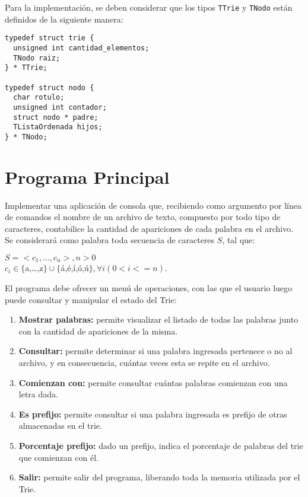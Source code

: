 \documentclass[12pt,a4paper]{article}
\begin{document}
\pagebreak

Para la implementación, se deben considerar que los tipos \texttt{TTrie} y \texttt{TNodo} están definidos de la siguiente manera:

\begin{verbatim}
typedef struct trie {
  unsigned int cantidad_elementos;
  TNodo raiz;
} * TTrie;

typedef struct nodo {
  char rotulo;
  unsigned int contador;
  struct nodo * padre;
  TListaOrdenada hijos;
} * TNodo;

\end{verbatim}

\section{Programa Principal}
Implementar una aplicación de consola que, recibiendo como argumento por línea de comandos el nombre de un archivo de texto, compuesto por todo tipo de caracteres, contabilice la cantidad de apariciones de cada palabra en el archivo. Se considerará como palabra toda secuencia de caracteres $S$, tal que:
\begin{center}
$S=<c_1,\dots,c_n>, n>0$\\
$c_i \in \{$a,\dots,z$\} \cup \{$á,é,í,ó,ú$\}, \forall{i} (0<i<=n)$.
\end{center}

El programa debe ofrecer un menú de operaciones, con las que el usuario luego puede consultar y manipular el estado del Trie:
\begin{enumerate}	
	\item \textbf{Mostrar palabras:} permite visualizar el listado de todas las palabras junto con la cantidad de apariciones de la misma.
	
	\item \textbf{Consultar:} permite determinar si una palabra ingresada pertenece o no al archivo, y en consecuencia, cuántas veces esta se repite en el archivo.
	
	\item \textbf{Comienzan con:} permite consultar cuántas palabras comienzan con una letra dada.
	
	\item \textbf{Es prefijo:} permite consultar si una palabra ingresada es prefijo de otras almacenadas en el trie.

	\item \textbf{Porcentaje prefijo:} dado un prefijo, indica el porcentaje de palabras del trie que comienzan con él. 
	
	\item \textbf{Salir:} permite salir del programa, liberando toda la memoria utilizada por el Trie.
\end{enumerate}
\end{document}
